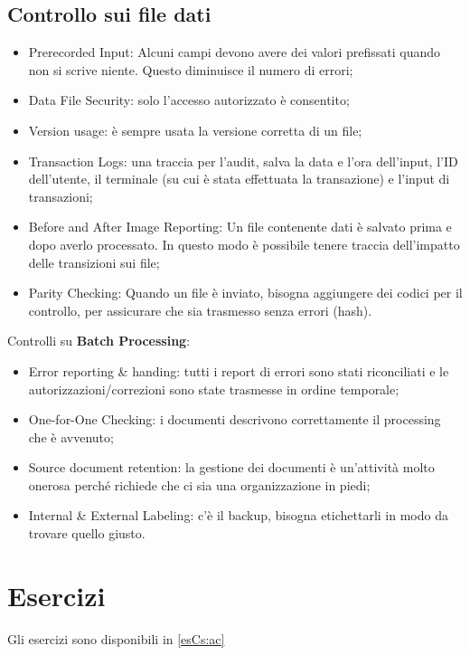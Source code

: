 \subsection{Controllo sui file dati}
\begin{itemize}
\item Prerecorded Input: Alcuni campi devono avere dei valori prefissati
quando non si scrive niente. Questo diminuisce il numero di errori;

\item Data File Security: solo l'accesso autorizzato è consentito;
\item Version usage: è sempre usata la versione corretta di un file;
\item Transaction Logs: una traccia per l'audit, salva la data e l'ora 
dell'input, l'ID dell'utente, il terminale (su cui è stata effettuata la 
transazione) e l'input di transazioni;
\item Before and After Image Reporting: Un file contenente dati è salvato
prima e dopo averlo processato. In questo modo è possibile tenere traccia
dell'impatto delle transizioni sui file;
\item Parity Checking: Quando un file è inviato, bisogna aggiungere dei codici
per il controllo, per assicurare che sia trasmesso senza errori (hash).
\end{itemize}

Controlli su \textbf{Batch Processing}:
\begin{itemize}
\item
Error reporting \& handing: tutti i report di errori sono stati riconciliati
e le autorizzazioni/correzioni sono state trasmesse in ordine temporale;
\item
One-for-One Checking: i documenti descrivono correttamente il processing
che è avvenuto;
\item
Source document retention: la gestione dei documenti è un'attività molto
onerosa perché richiede che ci sia una organizzazione in piedi;
\item
Internal \& External Labeling: c'è il backup, bisogna etichettarli in 
modo da trovare quello giusto.
\end{itemize}





\section{Esercizi}

Gli esercizi sono disponibili in \ref{esCs:ac}

